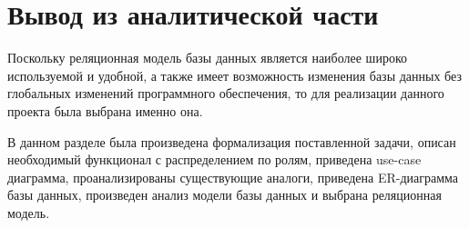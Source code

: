 
\section*{Вывод из аналитической части}
Поскольку реляционная модель базы данных является наиболее широко используемой и удобной, а также имеет возможность изменения базы данных без глобальных изменений программного обеспечения, то для реализации данного проекта была выбрана именно она.

В данном разделе была произведена формализация поставленной задачи, описан необходимый функционал с распределением по ролям, приведена use-case диаграмма, проанализированы существующие аналоги, приведена \newline ER-диаграмма базы данных, произведен анализ модели базы данных и выбрана реляционная модель.